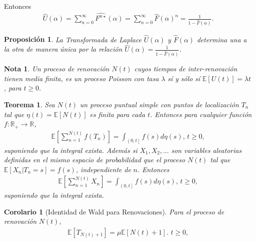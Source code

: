 \documentclass{article}
\newtheorem{Teo}{Teorema}%
\newtheorem{Note}{Nota}%
\newtheorem{Prop}{Proposición}%
\newtheorem{Cor}{Corolario}%
\newcommand{\rea}{\mathbb{R}}
\newcommand{\esp}{\mathbb{E}}
\numberwithin{equation}{section}
\begin{document}
Entonces
\begin{eqnarray}
\hat{U}\left(\alpha\right)=\sum_{n=0}^{\infty}\hat{F^{n\star}}\left(\alpha\right)=\sum_{n=0}^{\infty}\hat{F}\left(\alpha\right)^{n}=\frac{1}{1-\hat{F}\left(\alpha\right)}.
\end{eqnarray}

\begin{Prop}
La Transformada de Laplace $\hat{U}\left(\alpha\right)$ y $\hat{F}\left(\alpha\right)$ determina una a la otra de manera \'unica por la relaci\'on $\hat{U}\left(\alpha\right)=\frac{1}{1-\hat{F}\left(\alpha\right)}$.
\end{Prop}

\begin{Note}
Un proceso de renovaci\'on $N\left(t\right)$ cuyos tiempos de inter-renovaci\'on tienen media finita, es un proceso Poisson con tasa $\lambda$ s\'i y s\'olo s\'i $\esp\left[U\left(t\right)\right]=\lambda t$, para $t\geq0$.
\end{Note}

\begin{Teo}
Sea $N\left(t\right)$ un proceso puntual simple con puntos de localizaci\'on $T_{n}$ tal que $\eta\left(t\right)=\esp\left[N\left(t\right)\right]$ es finita para cada $t$. Entonces para cualquier funci\'on $f:\rea_{+}\rightarrow\rea$,
\begin{eqnarray}
\esp\left[\sum_{n=1}^{N\left(t\right)}f\left(T_{n}\right)\right]=\int_{\left(0,t\right]}f\left(s\right)d\eta\left(s\right)\textrm{,  }t\geq0,
\end{eqnarray}
suponiendo que la integral exista. Adem\'as si $X_{1},X_{2},\ldots$ son variables aleatorias definidas en el mismo espacio de probabilidad que el proceso $N\left(t\right)$ tal que $\esp\left[X_{n}|T_{n}=s\right]=f\left(s\right)$, independiente de $n$. Entonces
\begin{eqnarray}
\esp\left[\sum_{n=1}^{N\left(t\right)}X_{n}\right]=\int_{\left(0,t\right]}f\left(s\right)d\eta\left(s\right)\textrm{,  }t\geq0,
\end{eqnarray} 
suponiendo que la integral exista. 
\end{Teo}

\begin{Cor}[Identidad de Wald para Renovaciones]
Para el proceso de renovaci\'on $N\left(t\right)$,
\begin{eqnarray}
\esp\left[T_{N\left(t\right)+1}\right]=\mu\esp\left[N\left(t\right)+1\right]\textrm{.  }t\geq0,
\end{eqnarray}  
\end{Cor}
\end{document}
